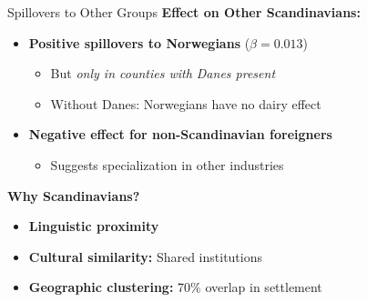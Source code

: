 \documentclass{beamer}
\begin{document}
\begin{frame}{Spillovers to Other Groups}
\textbf{Effect on Other Scandinavians:}
\begin{itemize}
    \item \textbf{Positive spillovers to Norwegians} ($\beta = 0.013$)
    \begin{itemize}
        \item But \textit{only in counties with Danes present}
        \item Without Danes: Norwegians have no dairy effect
    \end{itemize}
    \item \textbf{Negative effect for non-Scandinavian foreigners}
    \begin{itemize}
        \item Suggests specialization in other industries
    \end{itemize}
\end{itemize}

\vspace{0.3cm}
\textbf{Why Scandinavians?}
\begin{itemize}
    \item \textbf{Linguistic proximity} 
    \item \textbf{Cultural similarity:} Shared institutions
    \item \textbf{Geographic clustering:} 70\% overlap in settlement
\end{itemize}
\end{frame}
\end{document}
